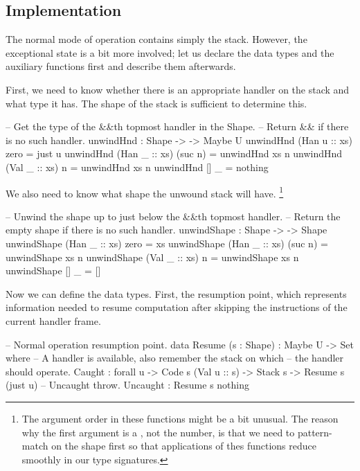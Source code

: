 \subsection{Implementation}

The normal mode of operation contains simply the stack. However, the exceptional state
is a bit more involved; let us declare the data types and the auxiliary functions first
and describe them afterwards.

First, we need to know whether there is an appropriate handler on the stack and what type
it has. The shape of the stack is sufficient to determine this.
\begin{code}
  -- Get the type of the &&\-th top\-most handler in the Shape.
  -- Return && if there is no such handler.
  unwindHnd : Shape -> \bN -> Maybe U
  unwindHnd (Han u :: xs) zero    = just u
  unwindHnd (Han _ :: xs) (suc n) = unwindHnd xs n
  unwindHnd (Val _ :: xs) n       = unwindHnd xs n
  unwindHnd []           _       = nothing
\end{code}

\noindent We also need to know what shape the unwound stack will have.%
\footnote{The argument order in these functions might be a bit unusual. The reason
why the first argument is a , not the number, is that we need to
pattern-match on the shape first so that applications of thes functions reduce
smoothly in our type signatures.}
\begin{code}
  -- Unwind the shape up to just below the &&\-th top\-most handler.
  -- Return the empty shape if there is no such handler.
  unwindShape : Shape -> \bN -> Shape
  unwindShape (Han _ :: xs) zero    = xs
  unwindShape (Han _ :: xs) (suc n) = unwindShape xs n
  unwindShape (Val _ :: xs) n       = unwindShape xs n
  unwindShape []           _       = []
\end{code}\label{sec:ham-unwindShape}

\noindent Now we can define the data types. First, the resumption point, which
represents information needed to resume computation after skipping the instructions
of the current handler frame.
\begin{code}
  -- Normal operation resumption point.
  data Resume (s : Shape) : Maybe U -> Set where
    -- A handler is available, also remember the stack on which
    -- the handler should operate.
    Caught : forall {u} -> Code s (Val u :: s) -> Stack s -> Resume s (just u)
    -- Uncaught throw.
    Uncaught : Resume s nothing
\end{code}

